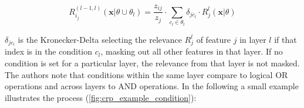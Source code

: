 \begin{equation}
    R^{(l-1, l)}_{i_j} (\mathbf{x} | \theta \cup \theta_l) = \frac{z_{ij}}{z_j} \cdot \sum_{c_l \in \theta_l} \delta_{jc_l} \cdot R^{l}_j (\mathbf{x} | \theta )
\end{equation}

$\delta_{jc_l}$ is the Kronecker-Delta selecting the relevance $R^l_j$ of feature $j$ in layer $l$ if that index is in the condition $c_l$, masking out all other features in that layer. If no condition is set for a particular layer, the relevance from that layer is not masked. The authors note that conditions within the same layer compare to logical OR operations and across layers to AND operations. In the following a small example illustrates the process (\autoref{fig:crp_example_condition}):


